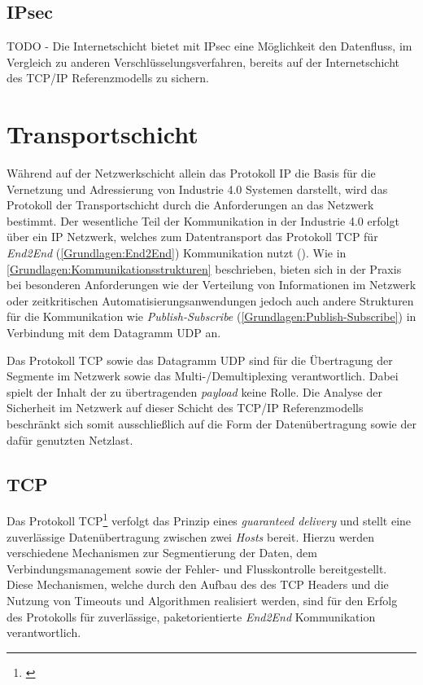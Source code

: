 \subsection{IPsec}
TODO - Die Internetschicht bietet mit IPsec eine Möglichkeit den Datenfluss, im Vergleich zu anderen Verschlüsselungsverfahren, bereits auf der Internetschicht des \ac{TCP}/\ac{IP} Referenzmodells zu sichern.

\section{Transportschicht}
\label{Analyse:Transportschicht}
Während auf der Netzwerkschicht allein das Protokoll \ac{IP} die Basis für die Vernetzung und Adressierung von Industrie 4.0 Systemen darstellt, wird das Protokoll der Transportschicht durch die Anforderungen an das Netzwerk bestimmt. Der wesentliche Teil der Kommunikation in der Industrie 4.0 erfolgt über ein \ac{IP} Netzwerk, welches zum Datentransport das Protokoll \ac{TCP} für \textit{End2End} (\autoref{Grundlagen:End2End}) Kommunikation nutzt (\cite{sichKom2017}). Wie in \autoref{Grundlagen:Kommunikationsstrukturen} beschrieben, bieten sich in der Praxis bei besonderen Anforderungen wie der Verteilung von Informationen im Netzwerk oder zeitkritischen Automatisierungsanwendungen jedoch auch andere Strukturen für die Kommunikation wie \textit{Publish-Subscribe} (\autoref{Grundlagen:Publish-Subscribe}) in Verbindung mit dem Datagramm \ac{UDP} an. 

Das Protokoll \ac{TCP} sowie das Datagramm \ac{UDP} sind für die Übertragung der Segmente im Netzwerk sowie das Multi-/Demultiplexing verantwortlich. Dabei spielt der Inhalt der zu übertragenden \textit{payload} keine Rolle. Die Analyse der Sicherheit im Netzwerk auf dieser Schicht des \ac{TCP}/\ac{IP} Referenzmodells beschränkt sich somit ausschließlich auf die Form der Datenübertragung sowie der dafür genutzten Netzlast.

\subsection{\ac{TCP}}
Das Protokoll \ac{TCP}\footnote{\cite{TCP}} verfolgt das Prinzip eines \textit{guaranteed delivery} und stellt eine zuverlässige Datenübertragung zwischen zwei \textit{Hosts} bereit. Hierzu werden verschiedene Mechanismen zur Segmentierung der Daten, dem Verbindungsmanagement sowie der Fehler- und Flusskontrolle bereitgestellt. Diese Mechanismen, welche durch den Aufbau des des \ac{TCP} Headers und die Nutzung von Timeouts und Algorithmen realisiert werden, sind für den Erfolg des Protokolls für zuverlässige, paketorientierte \textit{End2End} Kommunikation verantwortlich.

